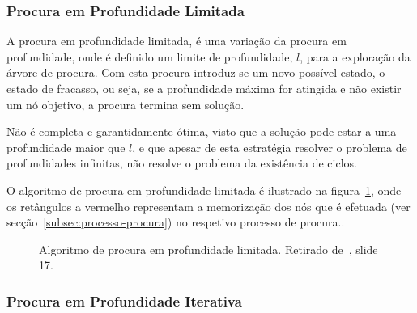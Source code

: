 \subsubsection{Procura em Profundidade Limitada}\label{subsubsec:procura-profundidade-limitada}

A procura em profundidade limitada, é uma variação da procura em profundidade, onde é definido um limite de profundidade, $l$, para a exploração da árvore de procura.
Com esta procura introduz-se um novo possível estado, o estado de fracasso, ou seja, se a profundidade máxima for atingida e não existir um nó objetivo, a procura termina sem solução.

Não é completa e garantidamente ótima, visto que a solução pode estar a uma profundidade maior que $l$, e que apesar de esta estratégia resolver o problema de profundidades infinitas, não resolve o problema da existência de ciclos.

O algoritmo de procura em profundidade limitada é ilustrado na figura~\ref{fig:alg-proc-prof-limitada}, onde os retângulos a vermelho representam a memorização dos nós que é efetuada (ver secção~\ref{subsec:processo-procura}) no respetivo processo de procura..

\begin{figure}[H]
    \begin{center}
    \end{center}
    \caption{Algoritmo de procura em profundidade limitada. Retirado de~\cite{isel:iasa:slides:proc-espaco-estados-parte-1}, slide 17.}
    \label{fig:alg-proc-prof-limitada}
\end{figure}

\subsubsection{Procura em Profundidade Iterativa}\label{subsubsec:procura-profundidade-iterativa}

